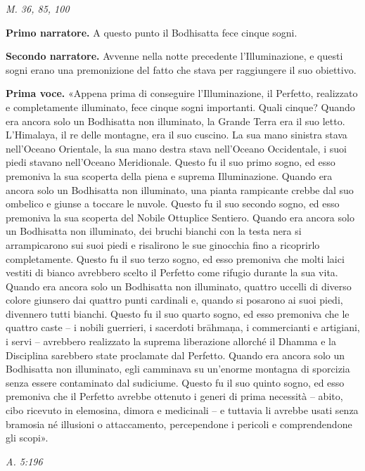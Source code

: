 \emph{M. 36, 85, 100}


\textbf{Primo narratore.} A questo punto il Bodhisatta fece cinque sogni.


\textbf{Secondo narratore.} Avvenne nella notte precedente l’Illuminazione, e
questi sogni erano una premonizione del fatto che stava per raggiungere
il suo obiettivo.


\textbf{Prima voce.} «Appena prima di conseguire l’Illuminazione, il Perfetto,
realizzato e completamente illuminato, fece cinque sogni importanti.
Quali cinque? Quando era ancora solo un Bodhisatta non illuminato, la
Grande Terra era il suo letto. L’Himalaya, il re delle montagne, era il
suo cuscino. La sua mano sinistra stava nell’Oceano Orientale, la sua
mano destra stava nell’Oceano Occidentale, i suoi piedi stavano
nell’Oceano Meridionale. Questo fu il suo primo sogno, ed esso premoniva
la sua scoperta della piena e suprema Illuminazione. Quando era ancora
solo un Bodhisatta non illuminato, una pianta rampicante crebbe dal suo
ombelico e giunse a toccare le nuvole. Questo fu il suo secondo sogno,
ed esso premoniva la sua scoperta del Nobile Ottuplice Sentiero. Quando
era ancora solo un Bodhisatta non illuminato, dei bruchi bianchi con la
testa nera si arrampicarono sui suoi piedi e risalirono le sue ginocchia
fino a ricoprirlo completamente. Questo fu il suo terzo sogno, ed esso
premoniva che molti laici vestiti di bianco avrebbero scelto il Perfetto
come rifugio durante la sua vita. Quando era ancora solo un Bodhisatta
non illuminato, quattro uccelli di diverso colore giunsero dai quattro
punti cardinali e, quando si posarono ai suoi piedi, divennero tutti
bianchi. Questo fu il suo quarto sogno, ed esso premoniva che le quattro
caste – i nobili guerrieri, i sacerdoti brāhmaṇa, i commercianti e
artigiani, i servi – avrebbero realizzato la suprema liberazione
allorché il Dhamma e la Disciplina sarebbero state proclamate dal
Perfetto. Quando era ancora solo un Bodhisatta non illuminato, egli
camminava su un’enorme montagna di sporcizia senza essere contaminato
dal sudiciume. Questo fu il suo quinto sogno, ed esso premoniva che il
Perfetto avrebbe ottenuto i generi di prima necessità – abito, cibo
ricevuto in elemosina, dimora e medicinali – e tuttavia li avrebbe usati
senza bramosia né illusioni o attaccamento, percependone i pericoli e
comprendendone gli scopi».


\emph{A. 5:196}


